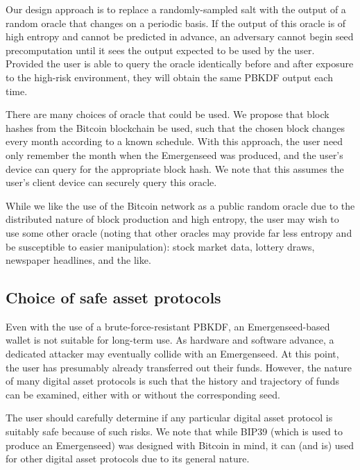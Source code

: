 \documentclass{article}
\begin{document}
Our design approach is to replace a randomly-sampled salt with the output of a random oracle that changes on a periodic basis.
If the output of this oracle is of high entropy and cannot be predicted in advance, an adversary cannot begin seed precomputation until it sees the output expected to be used by the user.
Provided the user is able to query the oracle identically before and after exposure to the high-risk environment, they will obtain the same PBKDF output each time.

There are many choices of oracle that could be used.
We propose that block hashes from the Bitcoin blockchain be used, such that the chosen block changes every month according to a known schedule.
With this approach, the user need only remember the month when the Emergenseed was produced, and the user's device can query for the appropriate block hash.
We note that this assumes the user's client device can securely query this oracle.

While we like the use of the Bitcoin network as a public random oracle due to the distributed nature of block production and high entropy, the user may wish to use some other oracle (noting that other oracles may provide far less entropy and be susceptible to easier manipulation): stock market data, lottery draws, newspaper headlines, and the like.


\subsection{Choice of safe asset protocols}

Even with the use of a brute-force-resistant PBKDF, an Emergenseed-based wallet is not suitable for long-term use.
As hardware and software advance, a dedicated attacker may eventually collide with an Emergenseed.
At this point, the user has presumably already transferred out their funds.
However, the nature of many digital asset protocols is such that the history and trajectory of funds can be examined, either with or without the corresponding seed.

The user should carefully determine if any particular digital asset protocol is suitably safe because of such risks.
We note that while BIP39 (which is used to produce an Emergenseed) was designed with Bitcoin in mind, it can (and is) used for other digital asset protocols due to its general nature.
\end{document}
